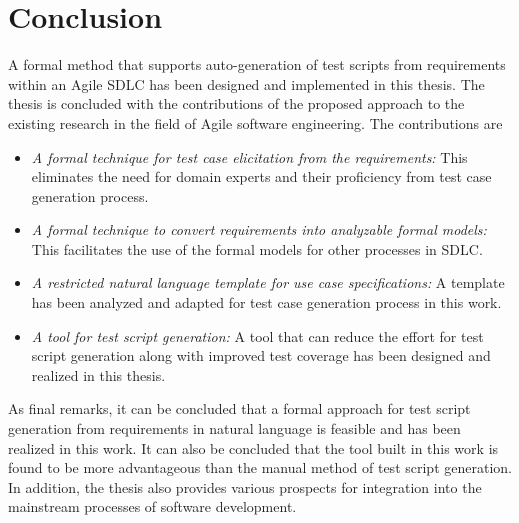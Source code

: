 \section{Conclusion}
A formal method that supports auto-generation of test scripts from requirements within an Agile SDLC has been designed and implemented in this thesis. The thesis is concluded with the contributions of the proposed approach to the existing research in the field of Agile software engineering. The contributions are
\begin{itemize}
\item \textit{A formal technique for test case elicitation from the requirements:} This eliminates the need for domain experts and their proficiency from test case generation process. 
\item \textit{A formal technique to convert requirements into analyzable formal models:} This facilitates the use of the formal models for other processes in SDLC.
\item \textit{A restricted natural language template for use case specifications:} A template has been analyzed and adapted for test case generation process in this work. 
\item \textit{A tool for test script generation:} A tool that can reduce the effort for test script generation along with improved test coverage has been designed and realized in this thesis.
\end{itemize}

As final remarks, it can be concluded that a formal approach for test script generation from requirements in natural language is feasible and has been realized in this work. It can also be concluded that the tool built in this work is found to be more advantageous than the manual method of test script generation. In addition, the thesis also provides various prospects for integration into the mainstream processes of software development.
